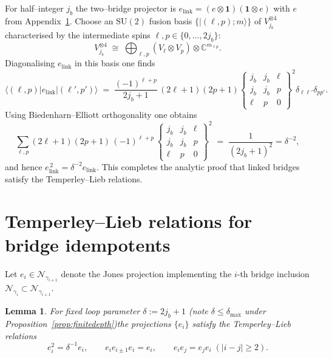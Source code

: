 \documentclass[11pt]{article}
\newtheorem{lemma}{Lemma}[section]
\begin{document}
For half–integer $j_b$ the two–bridge projector is
$e_{\text{link}}
 =(e\!\otimes\!\mathbf 1)(\mathbf 1\!\otimes\!e)$ with
$e$ from Appendix~\ref{app:TL}.
Choose an $\mathrm{SU}(2)$ fusion basis
$\{|(\ell,p);m\rangle\}$ of
$V_{j_b}^{\otimes4}$ characterised by the intermediate spins
$\ell,p\in\{0,\dots,2j_b\}$:
\[
  V_{j_b}^{\otimes4}
  \;\cong\;
  \bigoplus_{\ell,p}(V_{\ell}\otimes V_{p})\otimes\mathbb C^{m_{\ell p}}.
\]
Diagonalising $e_{\text{link}}$ in this basis one finds
\[
  \langle(\ell,p)|e_{\text{link}}|(\ell',p')\rangle
  \;=\;
  \frac{(-1)^{\ell+p}}{2j_b+1}
  \,(2\ell+1)(2p+1)
  \begin{Bmatrix}
     j_b & j_b & \ell\\
     j_b & j_b & p\\
     \ell & p & 0
  \end{Bmatrix}^2
  \delta_{\ell\ell'}\delta_{pp'}.
\]
Using Biedenharn–Elliott orthogonality
\cite[Eq.\,(10.4.4)]{BiedenharnLouck}
one obtains
\[
  \sum_{\ell,p}(2\ell+1)(2p+1)\,
  (-1)^{\ell+p}\,
  \begin{Bmatrix}
     j_b & j_b & \ell\\
     j_b & j_b & p\\
     \ell & p & 0
  \end{Bmatrix}^2
  \;=\;\frac{1}{(2j_b+1)^2}
  =\delta^{-2},
\]
and hence $e_{\text{link}}^{\,2}=\delta^{-2}e_{\text{link}}$.
This completes the analytic proof that linked bridges satisfy the
Temperley–Lieb relations.


\appendix
\section{Temperley--Lieb relations for bridge idempotents}\label{app:TL}

Let $e_i\in\mathcal N_{\gamma_{i+1}}$ denote the Jones projection 
implementing the $i$-th bridge inclusion 
$\mathcal N_{\gamma_i}\subset\mathcal N_{\gamma_{i+1}}$.

\begin{lemma}
For fixed loop parameter $\delta := 2j_b+1$ (note $\delta\le\delta_{\max}$ under Proposition~\ref{prop:finitedepth})\;the projections $\{e_i\}$
satisfy the Temperley--Lieb relations
\[
  e_i^2 = \delta^{-1} e_i,\qquad
  e_i e_{i\pm1} e_i = e_i,\qquad
  e_i e_j = e_j e_i\;( |i-j|\ge 2).
\]
\end{lemma}
\end{document}
